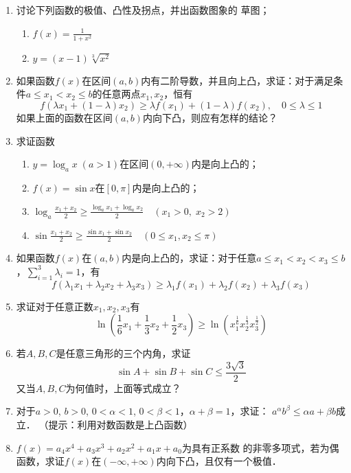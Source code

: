     \begin{ex}
    \begin{enumerate}
        \item 讨论下列函数的极值、凸性及拐点，并出函数图象的
        草图；
    \begin{multicols}{2}
    \begin{enumerate}
        \item $f(x)=\frac{1}{1+x^2}$
        \item $y=(x-1)\sqrt[3]{x^2}$
    \end{enumerate}
    \end{multicols}
    \item 如果函数$f(x)$在区间$(a,b)$内有二阶导数，并且向上凸，求证：对于满足条件$a\le x_1<x_2\le b$的任意两点$x_1,x_2$，恒有
    \[f (\lambda x_1+ (1-\lambda) x_2) \ge \lambda f (x_1) + (1-\lambda)f (x_2) ,\quad  0\le\lambda\le 1\]
    如果上面的函数在区间$(a,b)$内向下凸，则应有怎样的结论？
    \item 求证函数
    \begin{enumerate}
        \item $y=\log_ax \; (a>1)$在区间$(0,+\infty)$内是向上凸的；
        \item $f(x)=\sin x$在$[0,\pi]$内是向上凸的；
        \item $\log_a\frac{x_1+x_2}{2}\ge \frac{\log_a x_1+\log_a x_2}{2}\quad (x_1> 0,\; x_2>2)$
        \item $\sin\frac{x_1+x_2}{2}\ge \frac{\sin x_1+\sin x_2}{2}\quad  (0\le x_1,x_2\le \pi)$
    \end{enumerate}
    
    \item 如果函数$f(x)$在$(a,b)$内是向上凸的，求证：对于任意$a\le x_1<x_2<x_3\le b$，$\sum^3_{i=1}\lambda_i=1$，有
    \[f(\lambda_1x_1+\lambda_2x_2+\lambda_3x_3)\ge \lambda_1f(x_1)+\lambda_2f(x_2)+\lambda_3f(x_3)\]
    
    \item  求证对于任意正数$x_1,x_2,x_3$有
    \[\ln\left(\frac{1}{6}x_1+\frac{1}{3}x_2+\frac{1}{2}x_3\right) \ge \ln \left(x_1^{\tfrac{1}{6}}x_2^{\tfrac{1}{3}}x_3^{\tfrac{1}{2}} \right)\]
    \item  若$A,B,C$是任意三角形的三个内角，求证
    \[\sin A+\sin B+\sin C\le \frac{3\sqrt{3}}{2}\]
    又当$A,B,C$为何值时，上面等式成立？
    \item  对于$a>0$, $b>0$, $0<\alpha<1$, $0<\beta<1$，$\alpha+\beta=1$，求证：
    $a^{\alpha}b^{\beta}\le \alpha a+\beta b$成立．
    （提示：利用对数函数是上凸函数）
    \item  $f(x)=a_4x^4+a_3x^3+a_2x^2+a_1x+a_0$为具有正系数
    的非零多项式，若为偶函数，求证$f(x)$在$(-\infty,+\infty)$内向下凸，且仅有一个极值．
    \end{enumerate}
    \end{ex}
    

